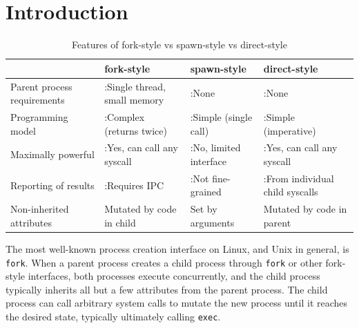 \documentclass[letterpaper,twocolumn,10pt]{article}
\newcommand{\tbad}{\makebox[\widthof{\ding{51}}]{\ding{55}}:}
\newcommand{\tgood}{\ding{51}:}
\begin{document}
\section{Introduction}\label{introduction}
\begin{table}
\begin{tabular}{l|l|l|l}
 & fork-style & spawn-style & direct-style\\
\hline
Parent process requirements & \tbad Single thread, small memory & \tgood None & \tgood None\\
Programming model & \tbad Complex (returns twice) & \tgood Simple (single call) & \tgood Simple (imperative)\\
Maximally powerful & \tgood Yes, can call any syscall & \tbad No, limited interface & \tgood Yes, can call any syscall\\
Reporting of results & \tbad Requires IPC & \tbad Not fine-grained & \tgood From individual child syscalls\\
Non-inherited attributes & Mutated by code in child & Set by arguments & Mutated by code in parent\\
\end{tabular}
\caption{Features of fork-style vs spawn-style vs direct-style}
\label{tab:styles}
\end{table}

The most well-known process creation interface on Linux, and Unix in general, is \texttt{fork}.
When a parent process creates a child process through \texttt{fork} or other fork-style interfaces,
both processes execute concurrently,
and the child process typically inherits all but a few attributes from the parent process\cite{manfork}.
The child process can call arbitrary system calls
to mutate the new process until it reaches the desired state,
typically ultimately calling \texttt{exec}.
\end{document}
